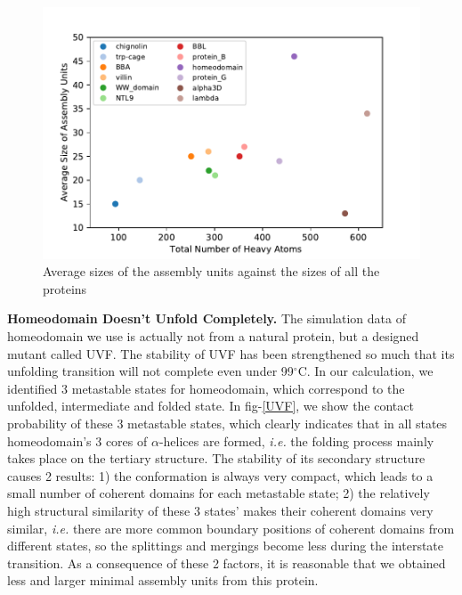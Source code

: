 \documentclass[journal=jacsat,manuscript=article]{achemso}
\begin{document}
\begin{figure}[htbp]
  \centering
  \includegraphics[width=1\textwidth]{stat_size_color.pdf}
  \caption{\label{all_stat}Average sizes of the assembly units against the sizes of all the proteins}
\end{figure}

{\bf Homeodomain Doesn't Unfold Completely.} The simulation data of homeodomain we use is actually not from a natural protein, but a designed mutant called UVF\cite{DE_Shaw_fast-folding}. The stability of UVF has been strengthened so much that its unfolding transition will not complete even under 99$^{\circ}$C\cite{UVF_earlier,UVF_origin}. In our calculation, we identified 3 metastable states for homeodomain, which correspond to the unfolded, intermediate and folded state. In fig-\ref{UVF}, we show the contact probability of these 3 metastable states, which clearly indicates that in all states homeodomain's 3 cores of $\alpha$-helices are formed, {\it i.e.} the folding process mainly takes place on the tertiary structure. The stability of its secondary structure causes 2 results: 1) the conformation is always very compact, which leads to a small number of coherent domains for each metastable state; 2) the relatively high structural similarity of these 3 states' makes their coherent domains very similar, {\it i.e.} there are more common boundary positions of coherent domains from different states, so the splittings and mergings become less during the interstate transition. As a consequence of these 2 factors, it is reasonable that we obtained less and larger minimal assembly units from this protein.
\end{document}
